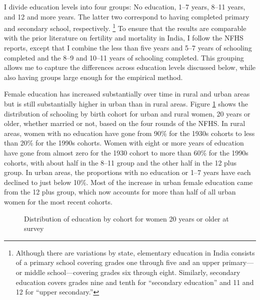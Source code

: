 \documentclass[12pt,letterpaper]{article}
\begin{document}
I divide education levels into four groups: No education, 1--7 years, 8--11 years, and 
12 and more years.
The latter two correspond to having completed primary and secondary school, 
respectively.%
\footnote{
Although there are variations by state, elementary education in India consists of a 
primary school covering grades one through five and an upper primary---or middle 
school---covering grades six through eight. 
Similarly, secondary education covers grades nine and tenth for ``secondary education'' 
and 11 and 12 for ``upper secondary.''
}
To ensure that the results are comparable with the prior literature on fertility
and mortality in India, I follow the NFHS reports, except that I combine the 
less than five years and 5--7 years of schooling completed and the 8--9 
and 10--11 years of schooling completed.
This grouping allows me to capture the differences across education levels discussed below, 
while also having groups large enough for the empirical method.


Female education has increased substantially over time in rural and urban areas but 
is still substantially higher in urban than in rural areas.
Figure \ref{fig:education_over_time} shows the distribution of schooling by birth 
cohort for urban and rural women, 
20 years or older, whether married or not, based on the four rounds of the NFHS.
In rural areas, women with no education have gone from 90\% for the 1930s cohorts to 
less than 20\% for the 1990s cohorts.
Women with eight or more years of education have gone from almost zero for the 1930 cohort 
to more than 60\% for the 1990s cohorts, with about half in the 8--11 group and the 
other half in the 12 plus group.
In urban areas, the proportions with no education or 1--7 years have each declined 
to just below 10\%.
Most of the increase in urban female education came from the 12 plus group, which 
now accounts for more than half of all urban women for the most recent cohorts.

\begin{figure}[htpb]
\centering
{} 
\caption{Distribution of education by cohort for women 20 years or older at survey}
\label{fig:education_over_time}
\end{figure}
\end{document}
